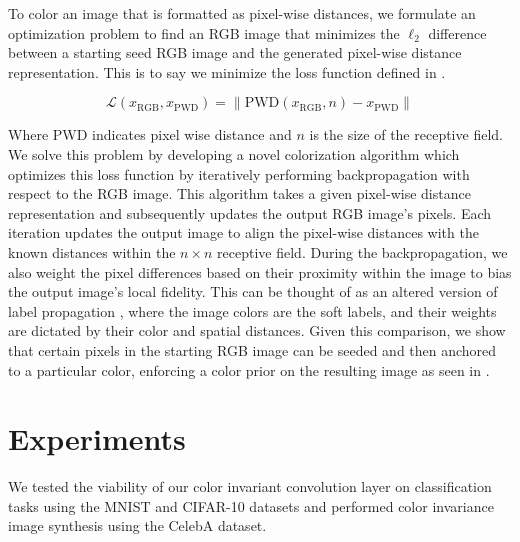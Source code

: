 \documentclass[10pt,twocolumn,letterpaper]{article}
\begin{document}
To color an image that is formatted as pixel-wise distances, we formulate an optimization problem to find an RGB image that minimizes the $\ell_2$ difference between a starting seed RGB image and the generated pixel-wise distance representation. This is to say we minimize the loss function defined in .

\begin{equation}
    \mathcal{L}(x_\text{RGB}, x_\text{PWD}) = \| \text{PWD}(x_\text{RGB}, n) - x_\text{PWD} \|
    \label{loss}
\end{equation}

Where PWD indicates pixel wise distance and $n$ is the size of the receptive field. We solve this problem by developing a novel colorization algorithm which optimizes this loss function by iteratively performing backpropagation with respect to the RGB image. This algorithm takes a given pixel-wise distance representation and subsequently updates the output RGB image's pixels. Each iteration updates the output image to align the pixel-wise distances with the known distances within the $n \times n$ receptive field. During the backpropagation, we also weight the pixel differences based on their proximity within the image to bias the output image's local fidelity. This can be thought of as an altered version of label propagation \cite{Zhu03}, where the image colors are the soft labels, and their weights are dictated by their color and spatial distances. Given this comparison, we show that certain pixels in the starting RGB image can be seeded and then anchored to a particular color, enforcing a color prior on the resulting image as seen in .

\section{Experiments}
We tested the viability of our color invariant convolution layer on classification tasks using the MNIST \cite{LeCun98} and CIFAR-10 \cite{cifar10} datasets and performed color invariance image synthesis using the CelebA \cite{celeba} dataset.
\end{document}

